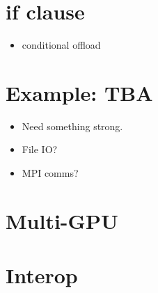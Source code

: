 \section{if clause}
\label{sec:if_clause}
\begin{itemize}
  \item conditional offload
\end{itemize}

\section{Example: TBA}
\begin{itemize}
  \item Need something strong.
  \item File IO?
  \item MPI comms?
\end{itemize}

\section{Multi-GPU}

\section{Interop}
\label{sec:interop}


